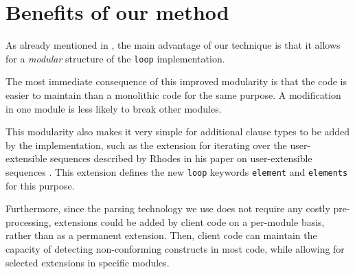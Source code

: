 \section{Benefits of our method}
\label{sec-benefits}
 
As already mentioned in ,
the main advantage of our technique is that it allows for a
\emph{modular} structure of the \texttt{loop} implementation.

The most immediate consequence of this improved modularity is that the
code is easier to maintain than a monolithic code for the same
purpose.  A modification in one module is less likely to break other
modules.

This modularity also makes it very simple for additional clause types
to be added by the \commonlisp{} implementation, such as the extension
for iterating over the user-extensible sequences described by Rhodes
in his paper on user-extensible sequences
\cite{Rhodes:2007:USC:1622123.1622138}.  This extension defines the
new \texttt{loop} keywords \texttt{element} and \texttt{elements} for
this purpose.

Furthermore, since the parsing technology we use does not require any
costly pre-processing, extensions could be added by client code on a
per-module basis, rather than as a permanent extension.  Then, client
code can maintain the capacity of detecting non-conforming constructs
in most code, while allowing for selected extensions in specific
modules.
